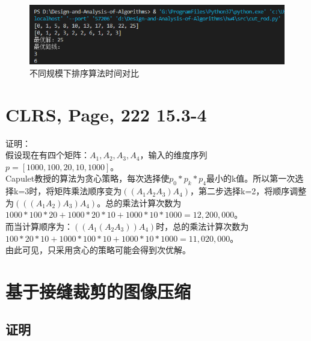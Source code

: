 \documentclass[UTF8]{ctexart}
\begin{document}
\begin{figure}[H]
    \centering
    \includegraphics[width=1\textwidth]{img/res-1.png}
    \caption{不同规模下排序算法时间对比}
    \label{带切割方案的备忘录方法}
\end{figure}



\section{CLRS, Page, 222 15.3-4}

证明：\\
假设现在有四个矩阵：$A_1, A_2, A_3, A_4$，输入的维度序列$ p = [1000, 100, 20, 10,1000] $。\\
Capulet教授的算法为贪心策略，每次选择使$p_0 * p_k * p_4$最小的k值。所以第一次选择k=3时，将矩阵乘法顺序变为$((A_1A_2A_3)A_4)$，第二步选择k=2，将顺序调整为$(((A_1A_2)A_3)A_4)$。总的乘法计算次数为$1000*100*20 + 1000*20*10 + 1000 * 10 * 1000 = 12,200,000$。\\

而当计算顺序为：$((A_1(A_2A_3))A_4)$时，总的乘法计算次数为$100*20*10 + 1000*100*10 + 1000 * 10 * 1000 = 11,020,000$。\\

由此可见，只采用贪心的策略可能会得到次优解。
  

\section{基于接缝裁剪的图像压缩}

\subsection{证明}
\end{document}
